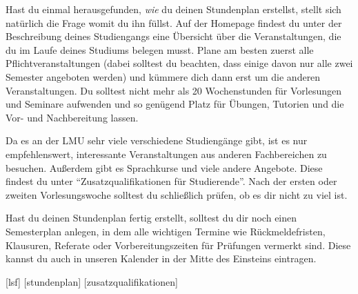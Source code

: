Hast du einmal herausgefunden, \textit{wie} du deinen Stundenplan erstellst, stellt sich natürlich die Frage womit du ihn füllst. Auf der Homepage findest du unter der Beschreibung deines Studiengangs eine Übersicht über die Veranstaltungen, die du im Laufe deines Studiums belegen musst. Plane am besten zuerst alle Pflichtveranstaltungen (dabei solltest du beachten, dass einige davon nur alle zwei Semester angeboten werden) und kümmere dich dann erst um die anderen Veranstaltungen. Du solltest nicht mehr als 20 Wochenstunden für Vorlesungen und Seminare aufwenden und so genügend Platz für Übungen, Tutorien und die Vor- und Nachbereitung lassen.

Da es an der LMU sehr viele verschiedene Studiengänge gibt, ist es nur empfehlenswert, interessante Veranstaltungen aus anderen Fachbereichen zu besuchen. Außerdem gibt es Sprachkurse und viele andere Angebote. Diese findest du unter ``Zusatzqualifikationen für Studierende''. Nach der ersten oder zweiten Vorlesungswoche solltest du schließlich prüfen, ob es dir nicht zu viel ist.

Hast du deinen Stundenplan fertig erstellt, solltest du dir noch einen Semesterplan anlegen, in dem alle wichtigen Termine wie Rückmeldefristen, Klausuren, Referate oder Vorbereitungszeiten für Prüfungen vermerkt sind. Diese kannst du auch in unseren Kalender in der Mitte des Einsteins eintragen.


\begin{urlList}
	[lsf]
	[stundenplan]
	[zusatzqualifikationen]
\end{urlList}

	


